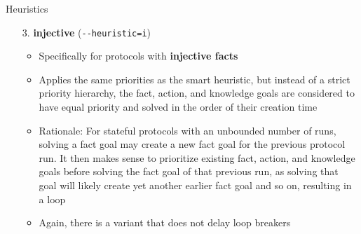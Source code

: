 \documentclass[11pt,aspectratio=169]{beamer}
\begin{document}
\begin{frame}[fragile]{Heuristics}
    \begin{enumerate}
        \item[3.] \textbf{injective} (\verb|--heuristic=i|)
        \begin{itemize}
            \item Specifically for protocols with \textbf{injective facts}
            \item Applies the same priorities as the smart heuristic, but 
                  instead of a strict priority hierarchy, the fact, action, and 
                  knowledge goals are considered to have equal priority and 
                  solved in the order of their creation time
            \item Rationale: For stateful protocols with an unbounded number of 
                  runs, solving a fact goal may create a new fact goal for the 
                  previous protocol run. It then makes sense to prioritize 
                  existing fact, action, and knowledge goals before solving the 
                  fact goal of that previous run, as solving that goal will 
                  likely create yet another earlier fact goal and so on, 
                  resulting in a loop
            \item Again, there is a variant that does not delay loop breakers
        \end{itemize}
    \end{enumerate}
\end{frame}
\end{document}
